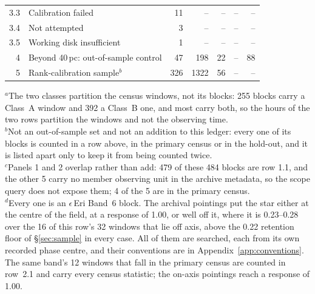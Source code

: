 \begin{tabular}{@{}r@{~}p{}rrrrr@{}}
3.3 & \hspace{0.8em}Calibration failed & 11 & -- & -- & -- & -- \\
3.4 & \hspace{0.8em}Not attempted & 3 & -- & -- & -- & -- \\
3.5 & \hspace{0.8em}Working disk insufficient & 1 & -- & -- & -- & -- \\
\hline
4 & Beyond 40\,pc: out-of-sample control & 47 & 198 & 22 & -- & 88 \\
5 & Rank-calibration sample$^{b}$ & 326 & 1322 & 56 & -- & -- \\
\hline
\end{tabular}

{\footnotesize\raggedright $^{a}$The two classes partition the census windows, not its blocks: 255 blocks carry a Class~A window and 392 a Class~B one, and most carry both, so the hours of the two rows partition the windows and not the observing time.\\ $^{b}$Not an out-of-sample set and not an addition to this ledger: every one of its blocks is counted in a row above, in the primary census or in the hold-out, and it is listed apart only to keep it from being counted twice.\\ $^{c}$Panels 1 and 2 overlap rather than add: 479 of these 484 blocks are row 1.1, and the other 5 carry no member observing unit in the archive metadata, so the scope query does not expose them; 4 of the 5 are in the primary census.\\ $^{d}$Every one is an $\epsilon$\,Eri Band~6 block. The archival pointings put the star either at the centre of the field, at a response of 1.00, or well off it, where it is 0.23--0.28 over the 16 of this row's 32 windows that lie off axis, above the 0.22 retention floor of \S\ref{sec:sample} in every case. All of them are searched, each from its own recorded phase centre, and their conventions are in Appendix~\ref{app:conventions}.\\ The same band's 12 windows that fall in the primary census are counted in row~2.1 and carry every census statistic; the on-axis pointings reach a response of 1.00.}
